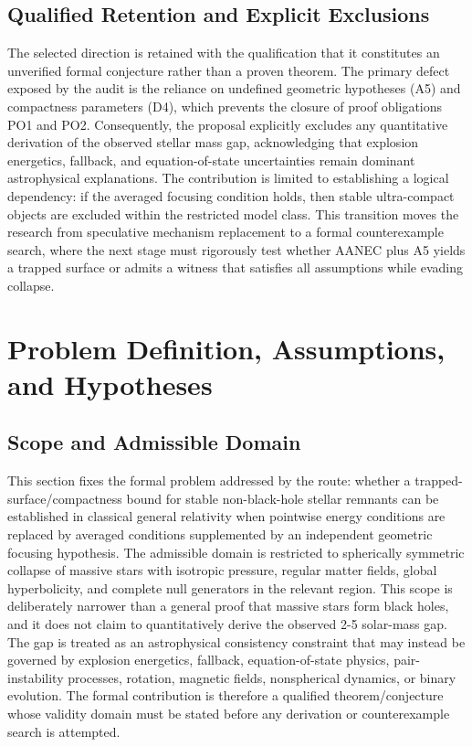 \documentclass[conference]{IEEEtran}
\begin{document}
\subsection{Qualified Retention and Explicit Exclusions}
The selected direction is retained with the qualification that it constitutes an unverified formal conjecture rather than a proven theorem. The primary defect exposed by the audit is the reliance on undefined geometric hypotheses (A5) and compactness parameters (D4), which prevents the closure of proof obligations PO1 and PO2. Consequently, the proposal explicitly excludes any quantitative derivation of the observed stellar mass gap, acknowledging that explosion energetics, fallback, and equation-of-state uncertainties remain dominant astrophysical explanations. The contribution is limited to establishing a logical dependency: if the averaged focusing condition holds, then stable ultra-compact objects are excluded within the restricted model class. This transition moves the research from speculative mechanism replacement to a formal counterexample search, where the next stage must rigorously test whether AANEC plus A5 yields a trapped surface or admits a witness that satisfies all assumptions while evading collapse.

\section{Problem Definition, Assumptions, and Hypotheses}
\subsection{Scope and Admissible Domain}
This section fixes the formal problem addressed by the route: whether a trapped-surface/compactness bound for stable non-black-hole stellar remnants can be established in classical general relativity when pointwise energy conditions are replaced by averaged conditions supplemented by an independent geometric focusing hypothesis. The admissible domain is restricted to spherically symmetric collapse of massive stars with isotropic pressure, regular matter fields, global hyperbolicity, and complete null generators in the relevant region. This scope is deliberately narrower than a general proof that massive stars form black holes, and it does not claim to quantitatively derive the observed 2-5 solar-mass gap. The gap is treated as an astrophysical consistency constraint that may instead be governed by explosion energetics, fallback, equation-of-state physics, pair-instability processes, rotation, magnetic fields, nonspherical dynamics, or binary evolution. The formal contribution is therefore a qualified theorem/conjecture whose validity domain must be stated before any derivation or counterexample search is attempted.~\cite{cite_0ed84243cf171bc4,cite_72d7ff391b29c495,cite_7a407c865faafd11}
\end{document}
